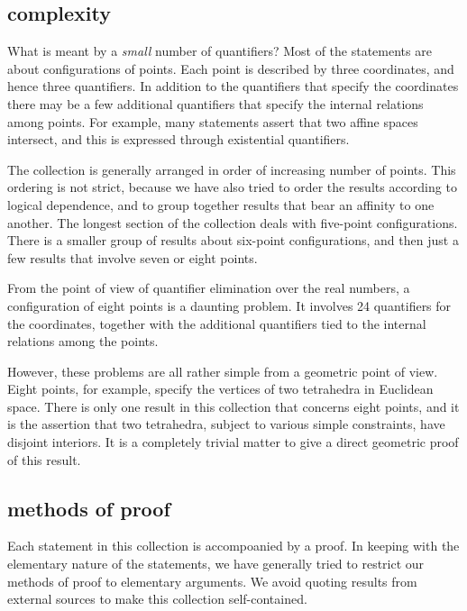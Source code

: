 \subsection{complexity}

What is meant by a {\it small} number of quantifiers?  Most of
the statements are about configurations of points.  Each point
is described by three coordinates, and hence three quantifiers.
In addition to the quantifiers that specify the coordinates there
may be a few additional quantifiers that specify the internal
relations among points.  For example, many statements assert that
two affine spaces intersect, and this is expressed through existential
quantifiers.
  
The collection is generally
arranged in order of increasing number of points.  This ordering
is not strict, because we have also tried to order the results
according to logical dependence, and to group together results 
that bear an affinity to one another.  The longest section of
the collection deals with five-point configurations.  
There is a smaller group of results about six-point configurations,
and then just a few results that involve seven or eight points.

From the point of view of quantifier elimination over the real
numbers, a configuration
of eight points is a daunting problem.  It involves 24 quantifiers
for the coordinates,  together with the additional
quantifiers tied to the internal relations among the points.



However, these problems are all rather simple from a geometric
point of view.  Eight points, for example, specify the
vertices of two tetrahedra in Euclidean space.    There is only
one result in this collection that concerns eight points, and
it is the assertion that two tetrahedra, subject to various
simple constraints, have disjoint interiors.  It is a completely
trivial
matter to give a direct geometric proof of this result.


\subsection{methods of proof}

Each statement in this collection is accompoanied by a proof.
In keeping with the elementary nature of the statements, 
we have generally tried to restrict our methods of proof to
elementary arguments.  We avoid quoting results from external
sources to make this collection self-contained.

